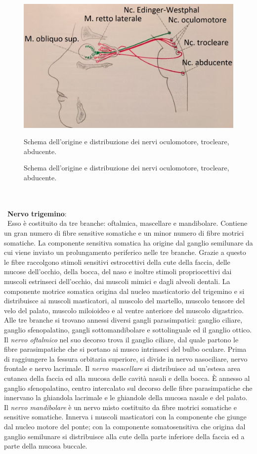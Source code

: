 \\\ \\\
\begin{figure}[h!]
	\centering
	\includegraphics[scale=0.15]{source/immagini/nervo_abducente.jpg}
	\caption{Schema dell'origine e distribuzione dei nervi oculomotore, trocleare, abducente.}{Schema dell'origine e distribuzione dei nervi oculomotore, trocleare, abducente.}
	\label{fig:test10}
\end{figure}
\\\ \\\ 
\textbf{Nervo trigemino}: 
\\\ Esso è costituito da tre branche: oftalmica, mascellare e mandibolare. Contiene un gran numero di fibre sensitive somatiche e un minor numero di fibre motrici somatiche. La componente sensitiva somatica ha origine dal ganglio semilunare da cui viene inviato un prolungamento periferico nelle tre branche. Grazie a questo le fibre raccolgono stimoli sensitivi estrocettivi della cute della faccia, delle mucose dell’occhio, della bocca, del naso e inoltre stimoli propriocettivi dai muscoli estrinseci dell’occhio, dai muscoli mimici e dagli alveoli dentali. La componente motrice somatica origina dal nucleo masticatorio del trigemino e si distribuisce ai muscoli masticatori, al muscolo del martello, muscolo tensore del velo del palato, muscolo miloioideo e al ventre anteriore del muscolo digastrico. 
Alle tre branche si trovano annessi diversi gangli parasimpatici: ganglio ciliare, ganglio sfenopalatino, gangli sottomandibolare e sottolinguale ed il ganglio ottico. 
Il \emph{nervo oftalmico} nel suo decorso trova il ganglio ciliare, dal quale partono le fibre parasimpatiche che si portano ai musco intrinseci del bulbo oculare. Prima di raggiungere la fessura orbitaria superiore, si divide in nervo nasociliare, nervo frontale e nervo lacrimale.
Il \emph{nervo mascellare} si distribuisce ad un’estesa area cutanea della faccia ed alla mucosa delle cavità nasali e della bocca. È annesso al ganglio sfenopalatino, centro intercalato sul decorso delle fibre parasimpatiche che innervano la ghiandola lacrimale e le ghiandole della mucosa nasale e del palato.
Il \emph{nervo mandibolare} è un nervo misto costituito da fibre motrici somatiche e sensitive somatiche. Innerva i muscoli masticatori con la componente che giunge dal nucleo motore del ponte; con la componente somatosensitiva che origina dal ganglio semilunare si distribuisce alla cute della parte inferiore della faccia ed a parte della mucosa buccale. 

